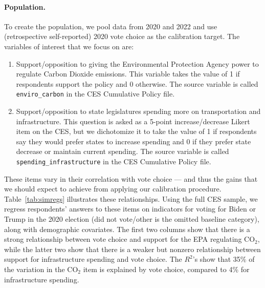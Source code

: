 \paragraph{Population.} To create the population, we pool data from 2020 and 2022 and use (retrospective self-reported) 2020 vote choice as the calibration target. The variables of interest that we focus on are:
\begin{enumerate}
    \item Support/opposition to giving the Environmental Protection Agency power to regulate Carbon Dioxide emissions. This variable takes the value of 1 if respondents support the policy and 0 otherwise. The source variable is called \texttt{enviro\_carbon} in the CES Cumulative Policy file.
    \item Support/opposition to state legislatures spending more on transportation and infrastructure. This question is asked as a 5-point increase/decrease Likert item on the CES, but we dichotomize it to take the value of 1 if respondents say they would prefer states to increase spending and 0 if they prefer state decrease or maintain current spending. The source variable is called \texttt{spending\_infrastructure} in the CES Cumulative Policy file.
\end{enumerate}

These items vary in their correlation with vote choice --- and thus the gains that we should expect to achieve from applying our calibration procedure.
Table~\ref{tab:simregs} illustrates these relationships. 
Using the full CES sample, we regress respondents' answers to these items on indicators for voting for Biden or Trump in the 2020 election (did not vote/other is the omitted baseline category), along with demographic covariates. 
The first two columns show that there is a strong relationship between vote choice and support for the EPA regulating CO$_2$, while the latter two show that there is a weaker but nonzero relationship between support for infrastructure spending and vote choice. 
The $R^2$'s show that 35\% of the variation in the CO$_2$ item is explained by vote choice, compared to 4\% for infrastructure spending. 

\begin{table}
    \caption{Relationship Between 2020 Vote and Attitudes on CO$_2$ Regulation and Infrastructure Spending}
    \label{tab:simregs}
    \centering
    
\end{table}


